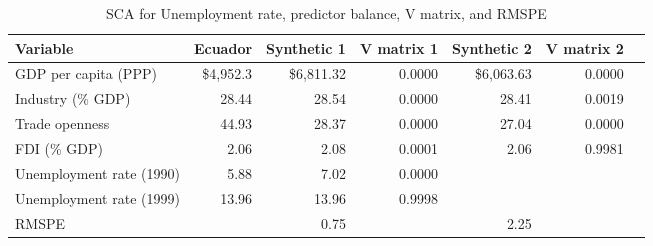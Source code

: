 \begin{table}[!htbp]
\begin{center}
\caption{SCA for Unemployment rate, predictor balance, V matrix, and RMSPE} \label{table:UNEMP_balance}
\begin{tabular}{l r r r r r r}     \\ \toprule
  Variable                 &    Ecuador &  Synthetic 1 & V matrix 1 & Synthetic 2 & V matrix 2 \\ \midrule 
  GDP per capita (PPP)     &  \$4,952.3 &   \$6,811.32 &     0.0000 &  \$6,063.63 &     0.0000 \\
  Industry (\% GDP)        &      28.44 &        28.54 &     0.0000 &       28.41 &     0.0019 \\
  Trade openness           &      44.93 &        28.37 &     0.0000 &       27.04 &     0.0000 \\
  FDI (\% GDP)             &       2.06 &         2.08 &     0.0001 &        2.06 &     0.9981 \\ \midrule
  Unemployment rate (1990) &       5.88 &         7.02 &     0.0000 &             &            \\
  Unemployment rate (1999) &      13.96 &        13.96 &     0.9998 &             &            \\ \midrule
  RMSPE                    &            &         0.75 &            &        2.25 &            \\
  \bottomrule 
\end{tabular}
\end{center}
\end{table}